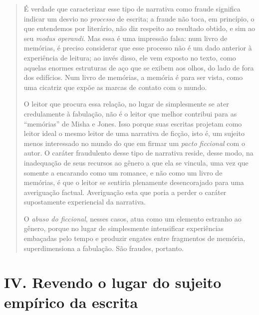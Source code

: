 \begin{quote}
É verdade que caracterizar esse tipo de narrativa como fraude significa
indicar um desvio no \emph{processo} de escrita; a fraude não toca, em
princípio, o que entendemos por literário, não diz respeito ao resultado
obtido, e sim ao seu \emph{modus operandi}. Mas essa é uma impressão
falsa: num livro de memórias, é preciso considerar que esse processo não
é um dado anterior à experiência de leitura; ao invés disso, ele vem
exposto no texto, como aquelas enormes estruturas de aço que se exibem
aos olhos, do lado de fora dos edifícios. Num livro de memórias, a
memória é para ser vista, como uma cicatriz que expõe as marcas de
contato com o mundo.

O leitor que procura essa relação, no lugar de simplesmente se ater
credulamente à fabulação, não é o leitor que melhor contribui para as
``memórias'' de Misha e Jones. Isso porque suas escritas projetam como
leitor ideal o mesmo leitor de uma narrativa de ficção, isto é, um
sujeito menos interessado no mundo do que em firmar um \emph{pacto
ficcional} com o autor. O caráter fraudulento desse tipo de narrativa
reside, desse modo, na inadequação de seus recursos ao gênero a que ela
se vincula, uma vez que somente a encarando como um romance, e não como
um livro de memórias, é que o leitor se sentiria plenamente
desencorajado para uma averiguação factual. Averiguação esta que poria a
perder o caráter supostamente experiencial da narrativa.

O \emph{abuso do ficcional}, nesses casos, atua como um elemento
estranho ao gênero, porque no lugar de simplesmente intensificar
experiências embaçadas pelo tempo e produzir engates entre fragmentos de
memória, superdimensiona a fabulação. São fraudes, portanto.
\end{quote}

\section*{IV. Revendo o lugar do sujeito empírico da escrita}

